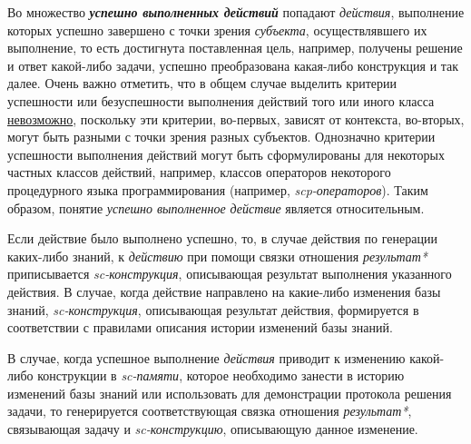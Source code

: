 \begin{frame}{}
\justifying
\vspace{10mm}
	
Во множество \textbf{\textit{успешно выполненных действий}} попадают \textit{действия}, выполнение которых успешно завершено с точки зрения \textit{субъекта}, осуществлявшего их выполнение, то есть достигнута поставленная цель, например, получены решение и ответ какой-либо задачи, успешно преобразована какая-либо конструкция и так далее. Очень важно отметить, что в общем случае выделить критерии успешности или безуспешности выполнения действий того или иного класса \uline{невозможно}, поскольку эти критерии, во-первых, зависят от контекста, во-вторых, могут быть разными с точки зрения разных субъектов. Однозначно критерии успешности выполнения действий могут быть сформулированы для некоторых частных классов действий, например, классов операторов некоторого процедурного языка программирования (например, \textit{scp-операторов}). Таким образом, понятие \textit{успешно выполненное действие} является относительным.
\end{frame}

\begin{frame}{}
\justifying
\vspace{10mm}

Если действие было выполнено успешно, то, в случае действия по генерации каких-либо знаний, к \textit{действию} при помощи связки отношения \textit{результат*} приписывается \textit{sc-конструкция}, описывающая результат выполнения указанного действия. В случае, когда действие направлено на какие-либо изменения базы знаний, \textit{sc-конструкция}, описывающая результат действия, формируется в соответствии с правилами описания истории изменений базы знаний.

\bigskip

В случае, когда успешное выполнение \textit{действия} приводит к изменению какой-либо конструкции в \textit{sc-памяти}, которое необходимо занести в историю изменений базы знаний или использовать для демонстрации протокола решения задачи, то генерируется соответствующая связка отношения \textit{результат*}, связывающая задачу и \textit{sc-конструкцию}, описывающую данное изменение.
\end{frame}


